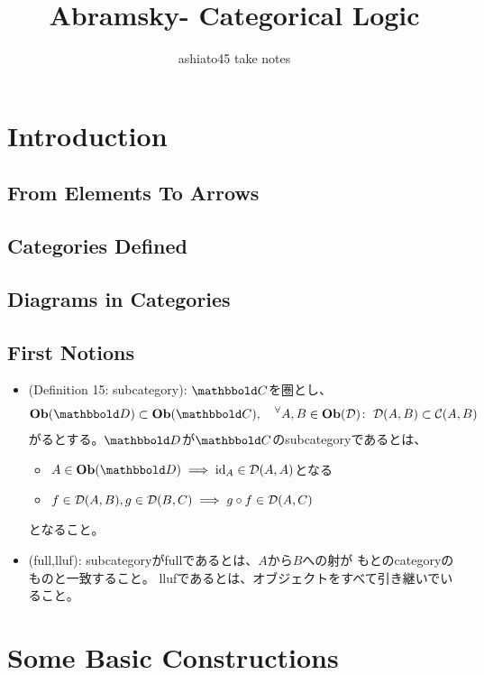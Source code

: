 \documentclass[9pt]{ltjsarticle}
\title{Abramsky- Categorical Logic}
\author{ashiato45 take notes}
\begin{document}
\maketitle

\section{Introduction}
\label{sec:Introduction}
\subsection{From Elements To Arrows}
\label{sub:From Elements To Arrows}
\subsection{Categories Defined}
\label{sub:Categories Defined}
\subsection{Diagrams in Categories}
\label{sub:Diagrams in Categories}
\subsection{First Notions}
\label{sub:First Notions}
\begin{itemize}
  \item (Definition 15: subcategory):
  $\C$を圏とし、
  \begin{align}
    \obj(\D)\subset \obj(\C),\quad
    \Forall{A,B\in \obj(\cal D)} \cal D(A,B) \subset \cal C(A,B)
  \end{align}
  がるとする。$\D$が$\C$のsubcategoryであるとは、
  \begin{itemize}
    \item $A\in \obj(\D) \implies \id_A \in \cal D(A,A)$となる
    \item $f\in \cal D(A,B),g\in \cal D(B,C)\implies g\circ f \in \cal D(A,C)$
  \end{itemize}
  となること。
  \item (full,lluf):
  subcategoryがfullであるとは、$A$から$B$への射が
  もとのcategoryのものと一致すること。
  llufであるとは、オブジェクトをすべて引き継いでいること。

\end{itemize}

\section{Some Basic Constructions}
\label{sec:Some Basic Constructions}
\end{document}
